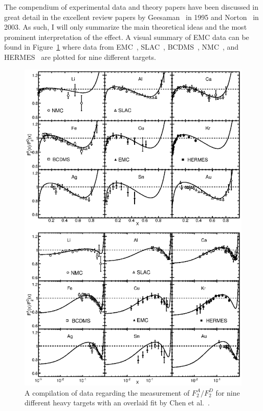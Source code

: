 The compendium of experimental data and theory papers have been discussed in great detail in the excellent review papers by Geesaman~\cite{Geesaman:1995yd} in 1995 and Norton~\cite{norton:emc-review} in 2003. As such, I will only summarize the main theoretical ideas and the most prominent interpretation of the effect. A visual summary of EMC data can be found in Figure~\ref{fig:emc-all-targ} where data from EMC~\cite{Aubert:1983xm}, SLAC~\cite{Arnold:1983mw, Gomez:1993ri}, BCDMS~\cite{Benvenuti:1987az}, NMC~\cite{Amaudruz:1991nw}, and HERMES~\cite{Ackerstaff:1999ac} are plotted for nine different targets.

\begin{figure}
	\centering
	\includegraphics[height=0.9\textheight]{figures/background/emc-all-targ.eps}
	\caption{A compilation of data regarding the measurement of $F^A_2/F_2^D$ for nine different heavy targets with an overlaid fit by Chen et al.~\cite{Chen:2013oga}.}
	\label{fig:emc-all-targ}
\end{figure}

